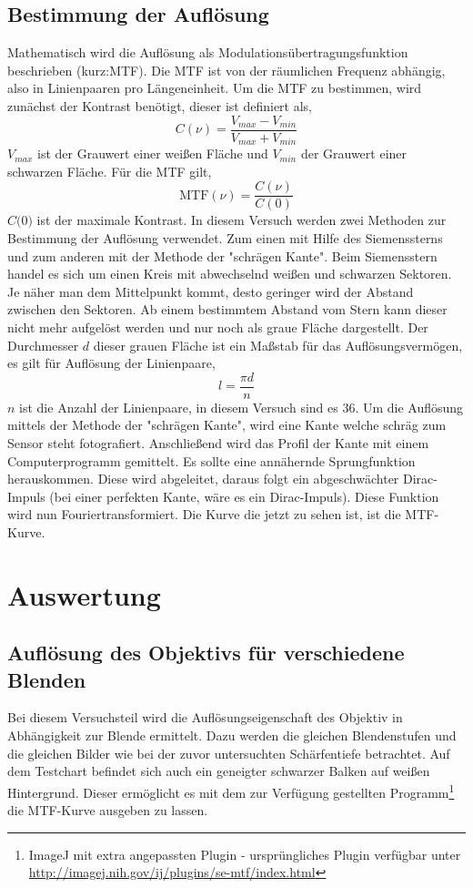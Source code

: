 \subsection{Bestimmung der Auflösung}
Mathematisch wird die Auflösung als Modulationsübertragungsfunktion beschrieben (kurz:MTF). Die MTF ist von der räumlichen Frequenz abhängig, also in Linienpaaren pro Längeneinheit. Um die MTF zu bestimmen, wird zunächst der Kontrast benötigt, dieser ist definiert als,
\begin{equation}
C(\nu)=\frac{V_{max}-V_{min}}{V_{max}+V_{min}}
\end{equation}
$ {V_{max}} $ ist der Grauwert einer weißen Fläche und $ {V_{min}} $ der Grauwert einer schwarzen Fläche. Für die MTF gilt,
\begin{equation}
\text{MTF}(\nu)=\frac{C(\nu)}{C(0)}
\end{equation}
$ \textit{C(0)} $ ist der maximale Kontrast.
In diesem Versuch werden zwei Methoden zur Bestimmung der Auflösung verwendet. Zum einen mit Hilfe des Siemenssterns und zum anderen mit der Methode der "schrägen Kante".
Beim Siemensstern handel es sich um einen Kreis mit abwechselnd weißen und schwarzen Sektoren. Je näher man dem Mittelpunkt kommt, desto geringer wird der Abstand zwischen den Sektoren. Ab einem bestimmtem Abstand vom Stern kann dieser nicht mehr aufgelöst werden und nur noch als graue Fläche dargestellt. Der Durchmesser $ \textit{d} $ dieser grauen Fläche ist ein Maßstab für das Auflösungsvermögen, es gilt für Auflösung der Linienpaare,
\begin{equation}
l=\frac{\pi d}{n}
\end{equation}
$ \textit{n} $ ist die Anzahl der Linienpaare, in diesem Versuch sind es 36.
Um die Auflösung mittels der Methode der "schrägen Kante", wird eine Kante welche schräg zum Sensor steht fotografiert. Anschließend wird das Profil der Kante mit einem Computerprogramm gemittelt. Es sollte eine annähernde Sprungfunktion herauskommen. Diese wird abgeleitet, daraus folgt ein abgeschwächter Dirac-Impuls (bei einer perfekten Kante, wäre es ein Dirac-Impuls). Diese Funktion wird nun Fouriertransformiert.
Die Kurve die jetzt zu sehen ist, ist die MTF-Kurve.

\newpage
\section{Auswertung}
\subsection{Auflösung des Objektivs für verschiedene Blenden}
Bei diesem Versuchsteil wird die Auflösungseigenschaft des Objektiv in Abhängigkeit zur Blende ermittelt. Dazu werden die gleichen Blendenstufen und die gleichen Bilder wie bei der zuvor untersuchten Schärfentiefe betrachtet. Auf dem Testchart befindet sich auch ein geneigter schwarzer Balken auf weißen Hintergrund. Dieser ermöglicht es mit dem zur Verfügung gestellten Programm\footnote{ImageJ mit extra angepassten Plugin - ursprüngliches Plugin verfügbar unter \url{http://imagej.nih.gov/ij/plugins/se-mtf/index.html}} die MTF-Kurve ausgeben zu lassen. \\

